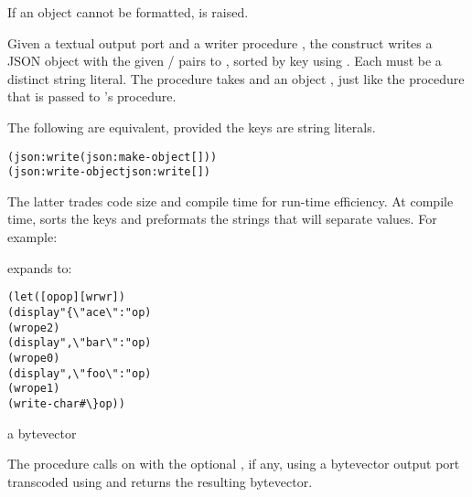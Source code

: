 If an object cannot be formatted, 
is raised.

\begin{syntax}
\end{syntax}

Given a textual output port  and a writer procedure ,
the  construct writes a JSON object with the given
 /  pairs to , sorted by key using
.
Each  must be a distinct string literal.
The  procedure takes  and an object , just like
the  procedure that is passed to 's
 procedure.

The following are equivalent, provided the keys are string literals.

\antipar\begin{alltt}
(json:write  (json:make-object [ ] \etc))
(json:write-object  json:write [ ] \etc)\end{alltt}\antipar

The latter trades code size and compile time for run-time efficiency.
At compile time,
 sorts the keys and
preformats the strings that will separate values.
For example:


expands to:

\begin{alltt}\antipar
(let ([op op] [wr wr])
  (display "\{\textbackslash"ace\textbackslash":" op)
  (wr op e2)
  (display ",\textbackslash"bar\textbackslash":" op)
  (wr op e0)
  (display ",\textbackslash"foo\textbackslash":" op)
  (wr op e1)
  (write-char \#\textbackslash\} op))\end{alltt}\antipar

\begin{procedure}
\end{procedure}
\returns{} a bytevector

The  procedure calls
 on  with the optional ,
if any, using a bytevector output port transcoded using
 and returns the resulting bytevector.

